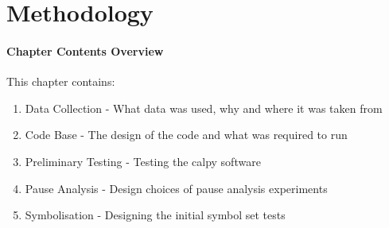 \chapter{Methodology}
%
%

\subsubsection{Chapter Contents Overview}
This chapter contains: 

\begin{enumerate}
\item Data Collection - What data was used, why and where it was taken from 
\item Code Base - The design of the code and what was required to run
\item Preliminary Testing - Testing the calpy software
\item Pause Analysis - Design choices of pause analysis experiments 
\item Symbolisation - Designing the initial symbol set tests
\end{enumerate}

\newpage


\newpage


\newpage
 

\newpage


\newpage


%


